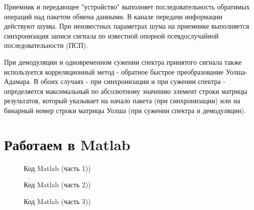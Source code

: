 \documentclass[12pt,a4paper]{scrartcl}
\begin{document}
Приемник и передающее "устройство" выполняет последовательность обратимых операций над пакетом обмена данными. В канале передачи информации действуют шумы. При неизвестных параметрах шума на приемнике выполняется синхронизация записи сигнала по известной опорной псевдослучайной последовательности (ПСП). 

При демодуляции и одновременном сужении спектра принятого сигнала также используется корреляционный метод - обратное быстрое преобразование Уолша-Адамара. В обоих случаях - при синхронизации и при сужении спектра - определяется максимальный по абсолютному значению элемент строки матрицы результатов, который указывает на начало пакета (при синхронизации) или на бинарный номер строки матрицы Уолша (при сужении спектра и демодуляции).

\clearpage
\newpage
\section{Работаем в Matlab}
\label{sec:AM}


\label{sec:part1}
\begin{figure}[h!]
\caption{Код Matlab (часть 1))}
\end{figure}

\label{sec:part2}
\begin{figure}[h!]
\caption{Код Matlab (часть 2))}
\end{figure}

\label{sec:part3}
\begin{figure}[h!]
\caption{Код Matlab (часть 3))}
\end{figure}
\end{document}
